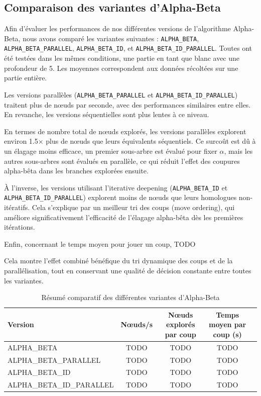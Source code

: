 \documentclass{article}
\begin{document}
\subsection{Comparaison des variantes d'Alpha-Beta} Afin d’évaluer les performances de nos différentes versions de l’algorithme Alpha-Beta, nous avons comparé les variantes suivantes : \texttt{ALPHA\_BETA}, \texttt{ALPHA\_BETA\_PARALLEL}, \texttt{ALPHA\_BETA\_ID}, et \texttt{ALPHA\_BETA\_ID\_PARALLEL}. Toutes ont été testées dans les mêmes conditions, une partie en tant que blanc avec une profondeur de 5. Les moyennes correspondent aux données récoltées sur une partie entière.

Les versions parallèles (\texttt{ALPHA\_BETA\_PARALLEL} et \texttt{ALPHA\_BETA\_ID\_PARALLEL}) traitent plus de nœuds par seconde, avec des performances similaires entre elles. En revanche, les versions séquentielles sont plus lentes à ce niveau.

En termes de nombre total de nœuds explorés, les versions parallèles explorent environ 1.5× plus de nœuds que leurs équivalents séquentiels. Ce surcoût est dû à un élagage moins efficace, un premier sous-arbre est évalué pour fixer $\alpha$, mais les autres sous-arbres sont évalués en parallèle, ce qui réduit l'effet des coupures alpha-bêta dans les branches explorées ensuite.

À l’inverse, les versions utilisant l’iterative deepening (\texttt{ALPHA\_BETA\_ID} et \texttt{ALPHA\_BETA\_ID\_PARALLEL}) explorent moins de nœuds que leurs homologues non-itératifs. Cela s’explique par un meilleur tri des coups (move ordering), qui améliore significativement l'efficacité de l’élagage alpha-bêta dès les premières itérations.

Enfin, concernant le temps moyen pour jouer un coup, TODO

Cela montre l’effet combiné bénéfique du tri dynamique des coups et de la parallélisation, tout en conservant une qualité de décision constante entre toutes les variantes.

\begin{table}[h]
    \centering
    \caption{Résumé comparatif des différentes variantes d'Alpha-Beta}
    \label{tab:ab_comparison}
    \begin{tabular}{|l|c|c|c|c|}
        \hline
        \textbf{Version} & \textbf{Nœuds/s} & \textbf{Nœuds explorés par coup} & \textbf{Temps moyen par coup (s)} \\
        \hline
        ALPHA\_BETA & TODO & TODO & TODO \\
        \hline
        ALPHA\_BETA\_PARALLEL & TODO & TODO & TODO \\
        \hline
        ALPHA\_BETA\_ID & TODO & TODO & TODO \\
        \hline
        ALPHA\_BETA\_ID\_PARALLEL & TODO & TODO & TODO \\
        \hline
    \end{tabular}
\end{table}
\end{document}
